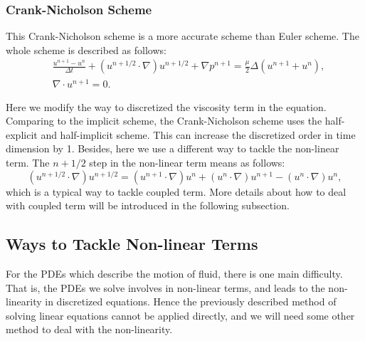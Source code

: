\documentclass[english, nochinese]{pkupaper}
\begin{document}
\subsubsection{Crank-Nicholson Scheme}
\par This Crank-Nicholson scheme is a more accurate scheme than Euler scheme. The whole scheme is described as follows:
\begin{equation}
	\begin{aligned}
		&\frac{u^{n+1} - u^n}{\Delta t} + (u^{n+1/2}\cdot\nabla)u^{n+1/2} + \nabla p^{n+1} = \frac{\mu}{2}\Delta(u^{n+1} + u^n),\\
		&\nabla\cdot u^{n+1} = 0.
	\end{aligned}
\end{equation}
\par Here we modify the way to discretized the viscosity term in the equation. Comparing to the implicit scheme, the Crank-Nicholson scheme uses the half-explicit and half-implicit scheme. This can increase the discretized order in time dimension by 1. Besides, here we use a different way to tackle the non-linear term. The $n+1/2$ step in the non-linear term means as follows:
\begin{equation}
	(u^{n+1/2}\cdot\nabla)u^{n+1/2} = (u^{n+1}\cdot\nabla)u^n + (u^n\cdot\nabla)u^{n+1} - (u^n\cdot\nabla)u^n,
\end{equation}
which is a typical way to tackle coupled term. More details about how to deal with coupled term will be introduced in the following subsection.

\subsection{Ways to Tackle Non-linear Terms} 
\par For the PDEs which describe the motion of fluid, there is one main difficulty. That is, the PDEs we solve involves in non-linear terms, and leads to the non-linearity in discretized equations. Hence the previously described method of solving linear equations cannot be applied directly, and we will need some other method to deal with the non-linearity.
\end{document}
